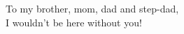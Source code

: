 \begin{dedication}
    To my brother, mom, dad and step-dad, \\
    I wouldn't be here without you!
\end{dedication}